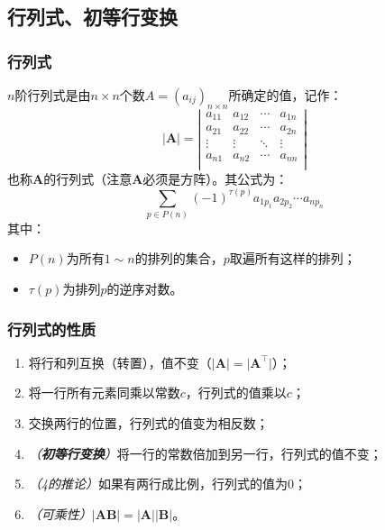 \documentclass[9pt,dvipsnames]{beamer}
\renewcommand{\det}[1]{\vert{#1}\vert}
\begin{document}
\subsection{行列式、初等行变换}
\begin{frame}
	\frametitle{行列式}
	$n$阶行列式是由$n\times n$个数$A=(a_{ij})_{n\times n}$所确定的值，记作：
	\[ \det{\mathbf{A}} = \left\vert\begin{matrix}
		a_{11} & a_{12} & \cdots & a_{1n} \\
		a_{21} & a_{22} & \cdots & a_{2n} \\
		\vdots & \vdots & \ddots & \vdots \\
		a_{n1} & a_{n2} & \cdots & a_{nn} \\
	\end{matrix}\right\vert \]
	也称$\mathbf{A}$的行列式（注意$\mathbf{A}$必须是方阵）。其公式为：
	\[ \sum_{p\in P(n)} (-1)^{\tau(p)} a_{1p_1}a_{2p_2}\cdots a_{np_n} \]
	其中：
	\begin{itemize}
		\item $P(n)$为所有$1\sim n$的排列的集合，$p$取遍所有这样的排列；
		\item $\tau(p)$为排列$p$的逆序对数。
	\end{itemize}
\end{frame}
\begin{frame}
	\frametitle{行列式的性质}
	\begin{enumerate}
		\item 将行和列互换（转置），值不变（$\det{\mathbf{A}}=\det{\mathbf{A}^\top}$）；\pause
		\item 将一行所有元素同乘以常数$c$，行列式的值乘以$c$；\pause
		\item 交换两行的位置，行列式的值变为相反数；\pause
		\item \textit{（\textbf{初等行变换}）}将一行的常数倍加到另一行，行列式的值不变；\pause
		\item \textit{（4的推论）}如果有两行成比例，行列式的值为0；\pause
		\item \textit{（可乘性）}$\det{\mathbf{AB}}=\det{\mathbf{A}}\det{\mathbf{B}}$。
	\end{enumerate}
\end{frame}
\end{document}
